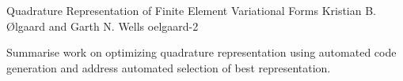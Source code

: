               {Quadrature Representation of Finite Element Variational Forms}
              {Kristian B. {\O}lgaard and Garth N. Wells}
              {oelgaard-2}

Summarise work on optimizing quadrature representation using automated code
generation and address automated selection of best representation. 
